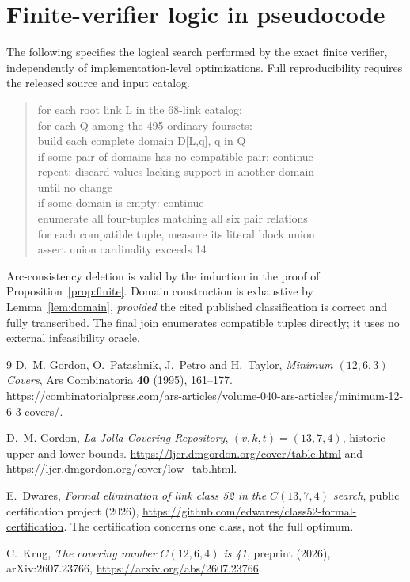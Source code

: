 \documentclass[11pt]{article}
\theoremstyle{definition}
\theoremstyle{remark}
\begin{document}
\section{Finite-verifier logic in pseudocode}\label{app:algorithm}
The following specifies the logical search performed by the exact
finite verifier, independently of implementation-level optimizations.
Full reproducibility requires the released source and input catalog.
\begin{quote}\small\ttfamily
for each root link L in the 68-link catalog:\\
\hspace*{1em}for each Q among the 495 ordinary foursets:\\
\hspace*{2em}build each complete domain D[L,q], q in Q\\
\hspace*{2em}if some pair of domains has no compatible pair: continue\\
\hspace*{2em}repeat: discard values lacking support in another domain\\
\hspace*{2em}until no change\\
\hspace*{2em}if some domain is empty: continue\\
\hspace*{2em}enumerate all four-tuples matching all six pair relations\\
\hspace*{2em}for each compatible tuple, measure its literal block union\\
\hspace*{2em}assert union cardinality exceeds 14
\end{quote}
Arc-consistency deletion is valid by the induction in the proof of
Proposition~\ref{prop:finite}. Domain construction is exhaustive by
Lemma~\ref{lem:domain}, \emph{provided} the cited published
classification is correct and fully transcribed. The final join enumerates compatible tuples directly; it uses no
external infeasibility oracle.

\begin{thebibliography}{9}
D.~M. Gordon, O.~Patashnik, J.~Petro and H.~Taylor,
\emph{Minimum $(12,6,3)$ Covers},
Ars Combinatoria \textbf{40} (1995), 161--177.
\url{https://combinatorialpress.com/ars-articles/volume-040-ars-articles/minimum-12-6-3-covers/}.

D.~M. Gordon, \emph{La Jolla Covering Repository},
$(v,k,t)=(13,7,4)$, historic upper and lower bounds.
\url{https://ljcr.dmgordon.org/cover/table.html} and
\url{https://ljcr.dmgordon.org/cover/low_tab.html}.

E.~Dwares, \emph{Formal elimination of link class 52 in the
$C(13,7,4)$ search}, public certification project (2026),
\url{https://github.com/edwares/class52-formal-certification}.
The certification concerns one class, not the full optimum.

C.~Krug, \emph{The covering number $C(12,6,4)$ is 41},
preprint (2026), arXiv:2607.23766,
\url{https://arxiv.org/abs/2607.23766}.
\end{thebibliography}
\end{document}
